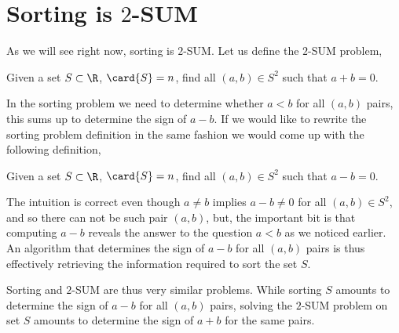 \section{Sorting is $2$-SUM}

As we will see right now, sorting is $2$-SUM. Let us define the $2$-SUM
problem,

\begin{problem}
Given a set $S \subset \R$, $\card{S} = n$, find all $(a,b) \in S^2$ such that
$a + b = 0$.
\end{problem}


In the sorting problem we need to determine whether $a < b$ for all $(a,b)$
pairs, this sums up to determine the sign of $a-b$. If we would like to rewrite
the sorting problem definition in the same fashion we would come up with the
following definition,

\begin{problem}
Given a set $S \subset \R$, $\card{S} = n$, find all $(a,b) \in S^2$ such that
$a - b = 0$.
\end{problem}

The intuition is correct even though $a \neq b$ implies $a-b \neq 0$ for all
$(a,b) \in S^2$, and so there can not be such pair $(a,b)$, but, the important
bit is that computing $a-b$ reveals the answer to the question $a<b$ as we
noticed earlier. An algorithm that determines the sign of $a-b$ for all $(a,b)$
pairs is thus effectively retrieving the information required to sort the set
$S$.

Sorting and $2$-SUM are thus very similar problems. While sorting $S$ amounts
to determine the sign of $a-b$ for all $(a,b)$ pairs, solving the $2$-SUM
problem on set $S$ amounts to determine the sign of $a+b$ for the same pairs.
